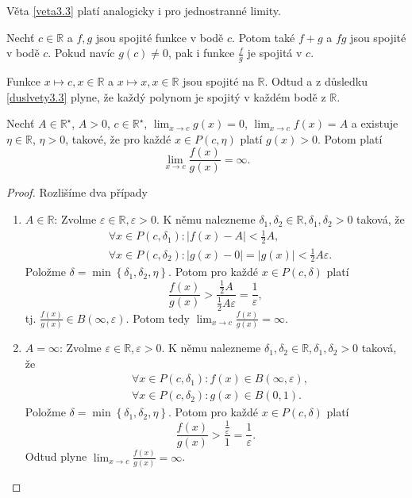 \begin{poznamka}
	Věta \ref{veta3.3} platí analogicky i pro jednostranné limity.
\end{poznamka}

\begin{dusledek}\label{duslvety3.3}
	Nechť $c\in \mathbb R $ a $f,g$ jsou spojité funkce v bodě $c$. Potom také $f+g$ a $fg$ jsou spojité
	v bodě $c$. Pokud navíc $g(c)\ne 0$, pak i funkce $\frac{f}{g}$ je spojitá v $c$.
\end{dusledek}

\begin{priklad}
	Funkce $x\mapsto c, x \in \mathbb R $ a $x\mapsto x, x \in \mathbb R $ jsou spojité na $\mathbb R $.
	Odtud a z důsledku \ref{duslvety3.3} plyne, že každý polynom je spojitý v každém bodě z $\mathbb R $.
\end{priklad}

\begin{veta}\label{veta3.4} %
Nechť $A \in \mathbb{R}^\star$, $A > 0$, $c \in \mathbb{R}^\star$,
$\lim_{x \to c} g(x) = 0$, $\lim_{x \to c} f(x) = A$ a existuje
$\eta \in \mathbb{R}$, $\eta > 0$, takové, že pro každé
$x \in P(c,\eta)$ platí $g(x) > 0$.
Potom platí
\[
\lim_{x \to c} \frac{f(x)}{g(x)} = \infty.
\]
\end{veta}

\begin{proof}
	Rozlišíme dva případy
	\begin{enumerate}[$i$.]
		\item $A\in \mathbb R $: Zvolme $\varepsilon \in \mathbb R , \varepsilon > 0$. K němu
		nalezneme $\delta_1, \delta_2 \in \mathbb R , \delta_1, \delta_2 > 0$ taková, že
		\begin{align*}
		&\forall x \in P(c, \delta_1): |f(x)-A|<\frac{1}{2}A,\\
		&\forall x \in P(c,\delta_2): |g(x) - 0| = |g(x)| < \frac{1}{2} A\varepsilon.
		\end{align*}
		Položme $\delta = \min \left \{ \delta_1, \delta_2, \eta \right \}. $ Potom pro každé $x \in P(c,\delta)$
		platí
		$$
  \frac{f(x)}{g(x)} > \frac{\frac{1}{2}A}{\frac{1}{2}A\varepsilon}=\frac{1}{\varepsilon},
		$$
		tj. $\frac{f(x)}{g(x)} \in B(\infty, \varepsilon)$. Potom tedy $\lim_{x\to c} \frac{f(x)}{g(x)} = \infty$.
		\item $A = \infty$: Zvolme $\varepsilon \in \mathbb R , \varepsilon > 0$. K němu
		nalezneme $\delta_1, \delta_2\in \mathbb R , \delta_1, \delta_2 >0$ taková, že
		\begin{align*}
			&\forall x \in P(c,\delta_1): f(x) \in B(\infty, \varepsilon), \\
			&\forall x \in P(c,\delta_2): g(x) \in B(0, 1).
        \end{align*}
        Položme $\delta = \min \left \{ \delta_1, \delta_2,\eta \right \} $. Potom pro každé $x \in P(c,\delta)$
        platí
        $$
        \frac{f(x)}{g(x)}> \frac{\frac{1}{\varepsilon}}{1} = \frac{1}{\varepsilon}.
        $$
        Odtud plyne $\lim_{x\to c} \frac{f(x)}{g(x)}=\infty$. \qedhere
	\end{enumerate}
\end{proof}

